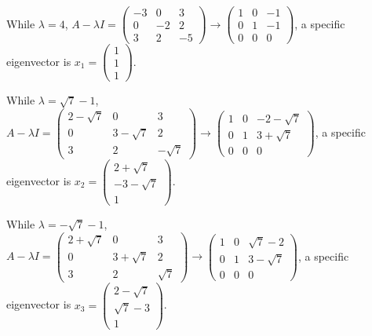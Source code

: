 \documentclass[letterpaper, 11pt]{article}
\newcommand{\1}{\mathds{1}}	%
\theoremstyle{definition}
\begin{document}
While $\lambda = 4$, $A - \lambda I = \begin{pmatrix}
    -3 & 0  & 3  \\
    0  & -2 & 2  \\
    3  & 2  & -5
  \end{pmatrix} \to \begin{pmatrix}
    1 & 0 & -1 \\
    0 & 1 & -1 \\
    0 & 0 & 0
  \end{pmatrix}$, a specific eigenvector is $x_1 = \begin{pmatrix}
    1 \\ 1 \\ 1
  \end{pmatrix}$.

While $\lambda = \sqrt{7} - 1$, $A - \lambda I = \begin{pmatrix}
    2-\sqrt{7} & 0          & 3         \\
    0          & 3-\sqrt{7} & 2         \\
    3          & 2          & -\sqrt{7}
  \end{pmatrix} \to \begin{pmatrix}
    1 & 0 & -2-\sqrt{7} \\
    0 & 1 & 3+\sqrt{7}  \\
    0 & 0 & 0
  \end{pmatrix}$, a specific eigenvector is $x_2 = \begin{pmatrix}
    2+\sqrt{7} \\ -3-\sqrt{7} \\ 1
  \end{pmatrix}$.

While $\lambda = -\sqrt{7} - 1$, $A - \lambda I = \begin{pmatrix}
    2+\sqrt{7} & 0          & 3        \\
    0          & 3+\sqrt{7} & 2        \\
    3          & 2          & \sqrt{7}
  \end{pmatrix} \to \begin{pmatrix}
    1 & 0 & \sqrt{7}-2   \\
    0 & 1 & 3 - \sqrt{7} \\
    0 & 0 & 0
  \end{pmatrix}$, a specific eigenvector is $x_3 = \begin{pmatrix}
    2-\sqrt{7} \\ \sqrt{7} - 3\\ 1
  \end{pmatrix}$.
\end{document}
